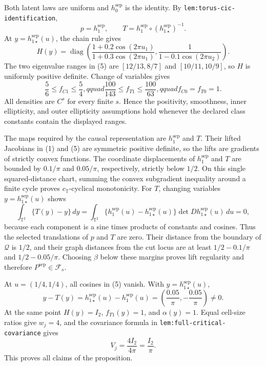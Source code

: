 Both latent laws are uniform and \(h_0^{\mathrm{sep}}\) is the identity.  By \texttt{lem:torus-cic-identification},
\[
 p=h_1^{\mathrm{sep}},\qquad
 T=h_1^{\mathrm{sep}}\circ(h_{1\star}^{\mathrm{sep}})^{-1}.           \tag{4}
\]
At \(y=h_{1\star}^{\mathrm{sep}}(u)\), the chain rule gives
\[
 H(y)=\operatorname{diag}\!\left(
 \frac{1+0.2\cos(2\pi u_1)}{1+0.3\cos(2\pi u_1)},
 \frac1{1-0.1\cos(2\pi u_2)}\right).                                \tag{5}
\]
The two eigenvalue ranges in (5) are \([12/13,8/7]\) and \([10/11,10/9]\), so \(H\) is uniformly positive definite.  Change of variables gives
\[
 \frac56\leq f_{C1}\leq\frac54,qquad
 \frac{100}{143}\leq f_{T1}\leq\frac{100}{63},qquad
 f_{C0}=f_{T0}=1.                                                       \tag{6}
\]
All densities are \(C^s\) for every finite \(s\).  Hence the positivity, smoothness, inner ellipticity, and outer ellipticity assumptions hold whenever the declared class constants contain the displayed ranges.

The maps required by the causal representation are \(h_1^{\mathrm{sep}}\) and \(T\).  Their lifted Jacobians in (1) and (5) are symmetric positive definite, so the lifts are gradients of strictly convex functions.  The coordinate displacements of \(h_1^{\mathrm{sep}}\) and \(T\) are bounded by \(0.1/\pi\) and \(0.05/\pi\), respectively, strictly below \(1/2\).  On this single squared-distance chart, summing the convex subgradient inequality around a finite cycle proves \(c_{\mathbb T}\)-cyclical monotonicity.  For \(T\), changing variables \(y=h_{1\star}^{\mathrm{sep}}(u)\) shows
\[
 \int_{\mathbb T^2}\{T(y)-y\}\,dy
 =\int_{\mathbb T^2}\{h_1^{\mathrm{sep}}(u)-h_{1\star}^{\mathrm{sep}}(u)\}
   \det Dh_{1\star}^{\mathrm{sep}}(u)\,du=0,                         \tag{7}
\]
because each component is a sine times products of constants and cosines.  Thus the selected translations of \(p\) and \(T\) are zero.  Their distance from the boundary of \(\mathcal Q\) is \(1/2\), and their graph distances from the cut locus are at least \(1/2-0.1/\pi\) and \(1/2-0.05/\pi\).  Choosing \(\beta\) below these margins proves lift regularity and therefore \(P^{\mathrm{sep}}\in\mathcal F_s\).

At \(u=(1/4,1/4)\), all cosines in (5) vanish.  With \(y=h_{1\star}^{\mathrm{sep}}(u)\),
\[
 y-T(y)=h_{1\star}^{\mathrm{sep}}(u)-h_1^{\mathrm{sep}}(u)
 =\left(\frac{0.05}{\pi},-\frac{0.05}{\pi}\right)\neq0.             \tag{8}
\]
At the same point \(H(y)=I_2\), \(f_{T1}(y)=1\), and \(\alpha(y)=1\).  Equal cell-size ratios give \(w_j=4\), and the covariance formula in \texttt{lem:full-critical-covariance} gives
\[
 V_j=\frac{4I_2}{4\pi}=\frac{I_2}{\pi}.                              \tag{9}
\]
This proves all claims of the proposition.
